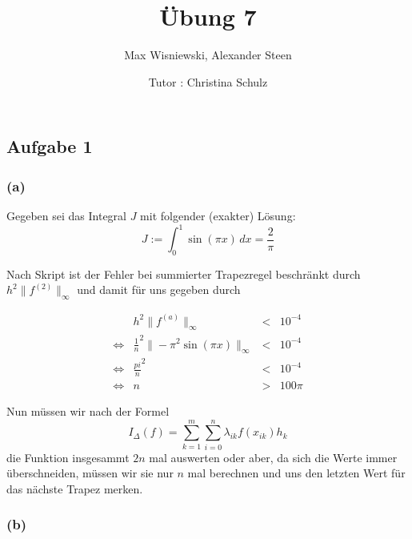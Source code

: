 \documentclass[11pt,a4paper,ngerman]{article}
\date{Tutor : Christina Schulz}
\title{Übung 7}
\author{Max Wisniewski, Alexander Steen}
\begin{document}

\renewcommand{\figurename}{Figure}

\maketitle
\thispagestyle{fancy}

\subsection*{Aufgabe 1}

\subsubsection*{(a)}

Gegeben sei das Integral $J$ mit folgender (exakter) Lösung:
\begin{equation*}
    J := \int_0^1 \sin(\pi x) \, dx = \frac{2}{\pi}
\end{equation*}

Nach Skript  ist der Fehler bei summierter Trapezregel beschränkt durch $h^2 \|f^{(2)} \|_\infty$ und damit für uns gegeben durch

\begin{equation*}\begin{array}{crcl}
    & h^2 \| f^{(a)} \|_\infty &<& 10^{-4}\\
\Leftrightarrow & \frac{1}{n}^2 \| -\pi^2 \sin (\pi x) \|_\infty &<& 10^{-4}\\
\Leftrightarrow & \frac{pi}{n}^2 &<& 10^{-4}\\
\Leftrightarrow & n &>& 100 \pi
\end{array}\end{equation*}

Nun müssen wir nach der Formel
$$
    I_\Delta (f) = \overset{m}{\underset{k=1}{\sum}} \overset{n}{\underset{i=0}{\sum}} \lambda_{ik} f(x_{ik}) h_k
$$
die Funktion insgesammt $2n$ mal auswerten oder aber, da sich die Werte immer überschneiden, müssen wir sie nur $n$ mal berechnen
und uns den letzten Wert für das nächste Trapez merken.

\subsubsection*{(b)}
\end{document}
